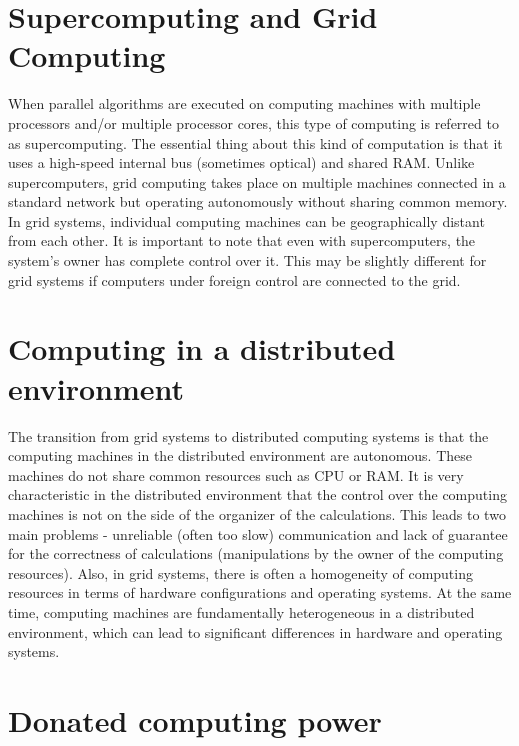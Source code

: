 \section{Supercomputing and Grid Computing}

When parallel algorithms are executed on computing machines with multiple processors and/or multiple processor cores, this type of computing is referred to as supercomputing. The essential thing about this kind of computation is that it uses a high-speed internal bus (sometimes optical) and shared RAM. Unlike supercomputers, grid computing takes place on multiple machines connected in a standard network but operating autonomously without sharing common memory. In grid systems, individual computing machines can be geographically distant from each other. It is important to note that even with supercomputers, the system's owner has complete control over it. This may be slightly different for grid systems if computers under foreign control are connected to the grid.

\section{Computing in a distributed environment}

The transition from grid systems to distributed computing systems is that the computing machines in the distributed environment are autonomous. These machines do not share common resources such as CPU or RAM. It is very characteristic in the distributed environment that the control over the computing machines is not on the side of the organizer of the calculations. This leads to two main problems - unreliable (often too slow) communication and lack of guarantee for the correctness of calculations (manipulations by the owner of the computing resources). Also, in grid systems, there is often a homogeneity of computing resources in terms of hardware configurations and operating systems. At the same time, computing machines are fundamentally heterogeneous in a distributed environment, which can lead to significant differences in hardware and operating systems.

\section{Donated computing power}

